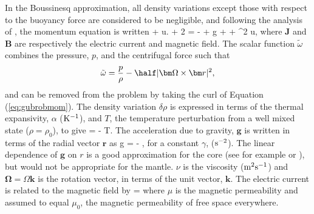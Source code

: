 In the Boussinesq
approximation, all density variations except those
with respect to the buoyancy
force are considered to be negligible, and following the
analysis of \cite{gubrob87},
the
momentum equation is written
\beq
{} +  {\bm u}.  +
 2 {\bm \Omega} 
=  - \nabla {\tilde {\omega}}
  +  { \bm g }
  + 
  + \nu \nabla ^2 {\bm u},
\label{eq:gubrobmom}
\eeq
where ${\bm J}$ and ${\bm B}$ are respectively the 
electric current and magnetic field.
The scalar function ${\tilde {\omega}}$ combines
the pressure, $p$, and the centrifugal force such that
\begin{displaymath}
{\tilde {\omega}} = \frac{p}{\rho} -
 \half | {\bm \Omega} \times {\bm r} |^2,
\end{displaymath}
and can be removed from the problem by taking the
curl of Equation (\ref{eq:gubrobmom}).
The density variation $\delta \rho$ is expressed in terms
of the thermal expansivity, $\alpha$ (${\rm K}^{-1}$),
and $T$, the temperature perturbation from a well mixed state
($\rho = \rho_0$), to give
\beq
{}  = - \alpha T.
\label{eq:drho}
\eeq
The acceleration due to gravity, ${\bm g }$ is written in terms
of the radial vector ${\bm r }$ as
\beq
{\bm g } = - ,
\label{eq:ggamma}
\eeq
for a constant $\gamma$, (${\rm s}^{-2}$).
The linear
dependence of ${\bm g }$ on $r$ is a good approximation
for the core (see for example \cite{81dzieand}
or \cite{89anderson}),
but would not be appropriate for the mantle.
$\nu$ is the viscosity (${\rm m}^2{\rm s}^{-1}$) and
${\bm \Omega } = \Omega {\bm k }$ is the rotation vector,
in terms of the unit vector, ${\bm k }$.
The electric current is related to the magnetic field by 
\beq
{} = 
\eeq
where ${\mu}$ is the magnetic permeability and 
assumed to equal ${\mu}_0$, the magnetic permeability of
free space everywhere.

